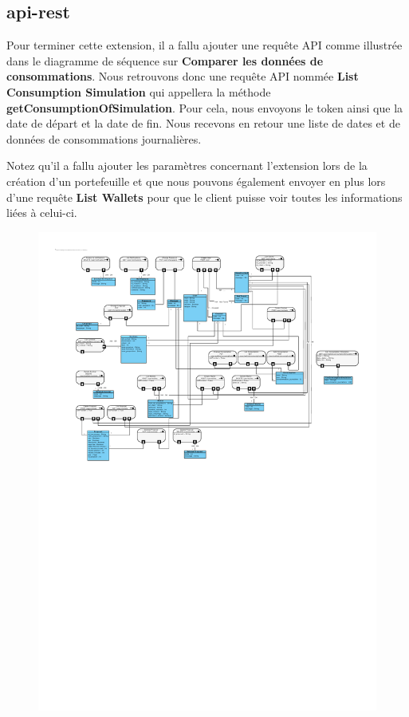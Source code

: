 \subsection{api-rest}

\begin{flushleft}
Pour terminer cette extension, il a fallu ajouter une requête API comme illustrée dans le diagramme de séquence sur \textbf{Comparer les données de consommations}. Nous retrouvons donc une requête API nommée \textbf{List Consumption Simulation} qui appellera la méthode \textbf{getConsumptionOfSimulation}. Pour cela, nous envoyons le token ainsi que la date de départ et la date de fin. Nous recevons en retour une liste de dates et de données de consommations journalières.
\end{flushleft}

\begin{flushleft}
Notez qu'il a fallu ajouter les paramètres concernant l'extension lors de la création d'un portefeuille et que nous pouvons également envoyer en plus lors d'une requête \textbf{List Wallets} pour que le client puisse voir toutes les informations liées à celui-ci.
\end{flushleft}

\begin{figure}[h]
\centering
\includegraphics[width=1.3\textwidth]{extension-adrien/Api-rest/img/apirest.pdf}
\end{figure}
